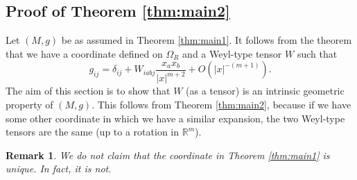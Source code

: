 \documentclass{amsart}
\newtheorem{rem}[thm]{Remark}
\newcommand{\abs}[1]{\left\vert#1\right\vert}
\newcommand{\Real}{\mathbb R}
\numberwithin{equation}{section}
\begin{document}
\subsection{Proof of Theorem \ref{thm:main2}}

Let $(M,g)$ be as assumed in Theorem \ref{thm:main1}. It follows from the theorem that we have a coordinate defined on $\Omega_R$ and a Weyl-type tensor $W$ such that
\[
	g_{ij}=\delta_{ij}+ W_{iabj} \frac{x_ax_b}{\abs{x}^{m+2}} + O(\abs{x}^{-(m+1)}).
\]
The aim of this section is to show that $W$ (as a tensor) is an intrinsic geometric property of $(M,g)$. This follows from Theorem \ref{thm:main2}, because if we have some other coordinate in which we have a similar expansion, the two Weyl-type tensors are the same (up to a rotation in $\Real^m$).

\begin{rem}
	We do not claim that the coordinate in Theorem \ref{thm:main1} is unique. In fact, it is not.
\end{rem}
\end{document}
